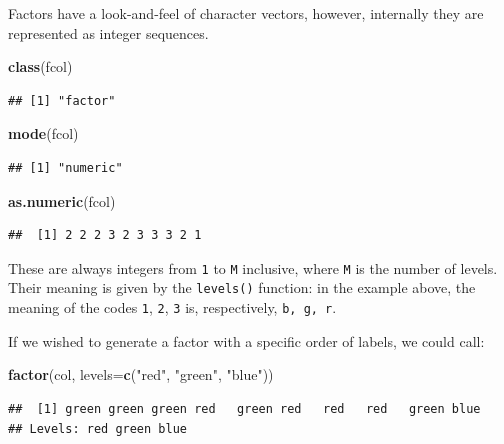 \documentclass[10pt,b5paper,krantz1]{krantz}
\newenvironment{Shaded}{\begin{snugshade}}{\end{snugshade}}
\newcommand{\DataTypeTok}[1]{\textcolor[rgb]{0.27,0.27,0.27}{#1}}
\newcommand{\KeywordTok}[1]{\textcolor[rgb]{0.27,0.27,0.27}{\textbf{#1}}}
\newcommand{\NormalTok}[1]{#1}
\newcommand{\StringTok}[1]{\textcolor[rgb]{0.5,0.5,0.5}{#1}}
\begin{document}
Factors have a look-and-feel of character vectors,
however, internally they are represented as integer sequences.

\begin{Shaded}
\begin{Highlighting}[]
\KeywordTok{class}\NormalTok{(fcol)}
\end{Highlighting}
\end{Shaded}

\begin{verbatim}
## [1] "factor"
\end{verbatim}

\begin{Shaded}
\begin{Highlighting}[]
\KeywordTok{mode}\NormalTok{(fcol)}
\end{Highlighting}
\end{Shaded}

\begin{verbatim}
## [1] "numeric"
\end{verbatim}

\begin{Shaded}
\begin{Highlighting}[]
\KeywordTok{as.numeric}\NormalTok{(fcol)}
\end{Highlighting}
\end{Shaded}

\begin{verbatim}
##  [1] 2 2 2 3 2 3 3 3 2 1
\end{verbatim}

These are always integers from \texttt{1} to \texttt{M} inclusive,
where \texttt{M} is the number of levels.
Their meaning is given by the \texttt{levels()} function:
in the example above, the meaning of the codes \texttt{1}, \texttt{2}, \texttt{3} is,
respectively, \texttt{b,\ g,\ r}.

If we wished to generate a factor with a specific order of labels,
we could call:

\begin{Shaded}
\begin{Highlighting}[]
\KeywordTok{factor}\NormalTok{(col, }\DataTypeTok{levels=}\KeywordTok{c}\NormalTok{(}\StringTok{"red"}\NormalTok{, }\StringTok{"green"}\NormalTok{, }\StringTok{"blue"}\NormalTok{))}
\end{Highlighting}
\end{Shaded}

\begin{verbatim}
##  [1] green green green red   green red   red   red   green blue 
## Levels: red green blue
\end{verbatim}
\end{document}
